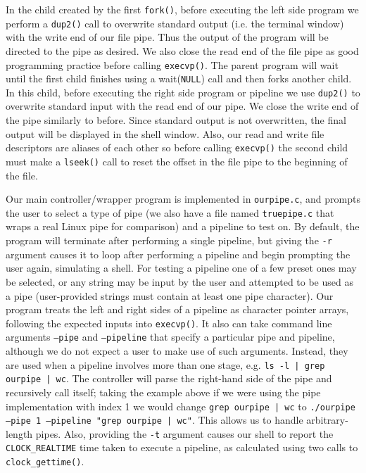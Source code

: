 In the child created by the first \texttt{fork()}, before executing the left side program we perform a \texttt{dup2()} call to overwrite standard output (i.e. the terminal window) with the write end of our file pipe. Thus the output of the program will be directed to the pipe as desired. We also close the read end of the file pipe as good programming practice before calling \texttt{execvp()}. The parent program will wait until the first child finishes using a wait(\texttt{NULL}) call and then forks another child. In this child, before executing the right side program or pipeline we use \texttt{dup2()} to overwrite standard input with the read end of our pipe. We close the write end of the pipe similarly to before. Since standard output is not overwritten, the final output will be displayed in the shell window. Also, our read and write file descriptors are aliases of each other so before calling \texttt{execvp()} the second child must make a \texttt{lseek()} call to reset the offset in the file pipe to the beginning of the file.

Our main controller/wrapper program is implemented in \texttt{ourpipe.c}, and prompts the user to select a type of pipe (we also have a file named \texttt{truepipe.c} that wraps a real Linux pipe for comparison) and a pipeline to test on. By default, the program will terminate after performing a single pipeline, but giving the \texttt{-r} argument causes it to loop after performing a pipeline and begin prompting the user again, simulating a shell. For testing a pipeline one of a few preset ones may be selected, or any string may be input by the user and attempted to be used as a pipe (user-provided strings must contain at least one pipe character). Our program treats the left and right sides of a pipeline as character pointer arrays, following the expected inputs into \texttt{execvp()}. It also can take command line arguments \texttt{--pipe} and \texttt{--pipeline} that specify a particular pipe and pipeline, although we do not expect a user to make use of such arguments. Instead, they are used when a pipeline involves more than one stage, e.g. \texttt{ls -l | grep ourpipe | wc}. The controller will parse the right-hand side of the pipe and recursively call itself; taking the example above if we were using the pipe implementation with index 1 we would change \texttt{grep ourpipe | wc} to \texttt{./ourpipe --pipe 1 --pipeline "grep ourpipe | wc"}. This allows us to handle arbitrary-length pipes. Also, providing the \texttt{-t} argument causes our shell to report the \texttt{CLOCK\_REALTIME} time taken to execute a pipeline, as calculated using two calls to \texttt{clock\_gettime()}.

